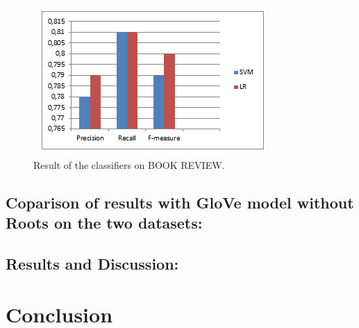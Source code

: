 \documentclass[conference]{IEEEtran}
\begin{document}
\begin{figure}[htpb]
	
	\centerline{\includegraphics{fig4.png}}
	\caption{Result of the classifiers on BOOK REVIEW.}
	\label{fig}
	
\end{figure}
\subsection{Coparison of results with GloVe model without Roots on the two datasets:}\label{AA}

\subsection{Results and Discussion:}\label{AA}


\section{Conclusion}





\end{document}

